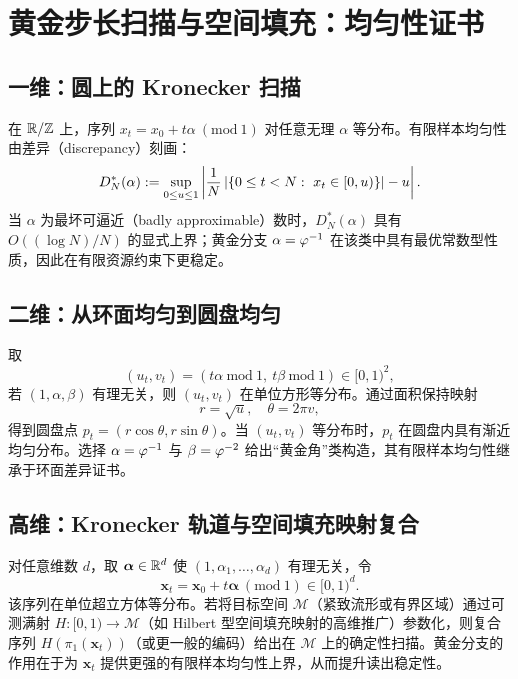 \section{黄金步长扫描与空间填充：均匀性证书}

\subsection{一维：圆上的 Kronecker 扫描}

在 $\mathbb{R}/\mathbb{Z}$ 上，序列 $x_t=x_0+t\alpha\ (\mathrm{mod}\ 1)$ 对任意无理 $\alpha$ 等分布。有限样本均匀性由差异（discrepancy）刻画：
\[
D_N^*(\alpha):=\sup_{0\le u\le 1}\left|\frac{1}{N}\card{\{0\le t<N:\ x_t\in[0,u)\}}-u\right|.
\]
当 $\alpha$ 为最坏可逼近（badly approximable）数时，$D_N^*(\alpha)$ 具有 $O((\log N)/N)$ 的显式上界；黄金分支 $\alpha=\varphi^{-1}$ 在该类中具有最优常数型性质，因此在有限资源约束下更稳定。

\subsection{二维：从环面均匀到圆盘均匀}

取
\[
(u_t,v_t)=(t\alpha\ \mathrm{mod}\ 1,\ t\beta\ \mathrm{mod}\ 1)\in[0,1)^2,
\]
若 $(1,\alpha,\beta)$ 有理无关，则 $(u_t,v_t)$ 在单位方形等分布。通过面积保持映射
\[
r=\sqrt{u},\quad \theta=2\pi v,
\]
得到圆盘点 $p_t=(r\cos\theta,r\sin\theta)$。当 $(u_t,v_t)$ 等分布时，$p_t$ 在圆盘内具有渐近均匀分布。选择 $\alpha=\varphi^{-1}$ 与 $\beta=\varphi^{-2}$ 给出“黄金角”类构造，其有限样本均匀性继承于环面差异证书。

\subsection{高维：Kronecker 轨道与空间填充映射复合}

对任意维数 $d$，取 $\boldsymbol\alpha\in\mathbb{R}^d$ 使 $(1,\alpha_1,\dots,\alpha_d)$ 有理无关，令
\[
\boldsymbol x_t=\boldsymbol x_0+t\boldsymbol\alpha\ (\mathrm{mod}\ 1)\in[0,1)^d.
\]
该序列在单位超立方体等分布。若将目标空间 $\mathcal M$（紧致流形或有界区域）通过可测满射 $H:[0,1)\to\mathcal M$（如 Hilbert 型空间填充映射的高维推广）参数化，则复合序列 $H(\pi_1(\boldsymbol x_t))$（或更一般的编码）给出在 $\mathcal M$ 上的确定性扫描。黄金分支的作用在于为 $\boldsymbol x_t$ 提供更强的有限样本均匀性上界，从而提升读出稳定性。

